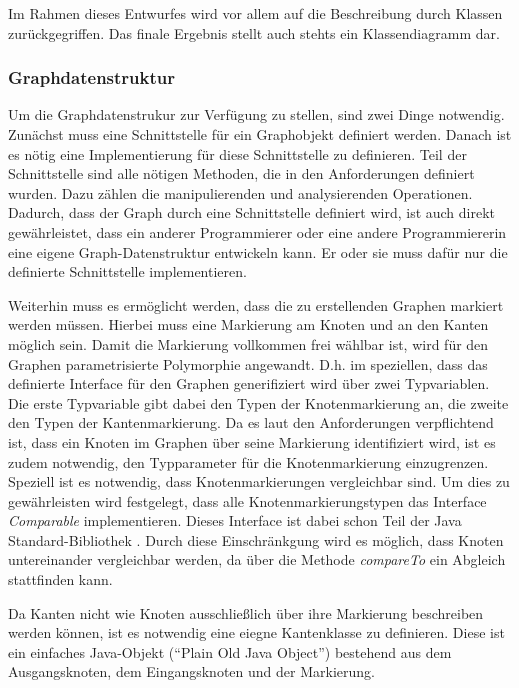 \documentclass[a4paper,12pt,ngerman,chapterprefix=false,listof=totoc,bibliography=totoc]{scrreprt}
\begin{document}
{{{Im Rahmen dieses Entwurfes wird vor allem auf die Beschreibung durch Klassen zurückgegriffen. Das finale Ergebnis stellt auch stehts ein Klassendiagramm dar.
}
\subsubsection*{Graphdatenstruktur}
{
Um die Graphdatenstrukur zur Verfügung zu stellen, sind zwei Dinge notwendig. Zunächst muss eine Schnittstelle für ein Graphobjekt definiert werden. Danach ist es nötig eine Implementierung für diese Schnittstelle zu definieren. Teil der Schnittstelle sind alle nötigen Methoden, die in den Anforderungen definiert wurden. Dazu zählen die manipulierenden und analysierenden Operationen. Dadurch, dass der Graph durch eine Schnittstelle definiert wird, ist auch direkt gewährleistet, dass ein anderer Programmierer oder eine andere Programmiererin eine eigene Graph-Datenstruktur entwickeln kann. Er oder sie muss dafür nur die definierte Schnittstelle implementieren.

Weiterhin muss es ermöglicht werden, dass die zu erstellenden Graphen markiert werden müssen. Hierbei muss eine Markierung am Knoten und an den Kanten möglich sein. Damit die Markierung vollkommen frei wählbar ist, wird für den Graphen parametrisierte Polymorphie angewandt. D.h. im speziellen, dass das definierte Interface für den Graphen generifiziert wird über zwei Typvariablen. Die erste Typvariable gibt dabei den Typen der Knotenmarkierung an, die zweite den Typen der Kantenmarkierung. Da es laut den Anforderungen verpflichtend ist, dass ein Knoten im Graphen über seine Markierung identifiziert wird, ist es zudem notwendig, den Typparameter für die Knotenmarkierung einzugrenzen. Speziell ist es notwendig, dass Knotenmarkierungen vergleichbar sind. Um dies zu gewährleisten wird festgelegt, dass alle Knotenmarkierungstypen das Interface \textit{Comparable} implementieren. Dieses Interface ist dabei schon Teil der Java Standard-Bibliothek \cite{oracle_java_2021}. Durch diese Einschränkgung wird es möglich, dass Knoten untereinander vergleichbar werden, da über die Methode \textit{compareTo} ein Abgleich stattfinden kann.

Da Kanten nicht wie Knoten ausschließlich über ihre Markierung beschreiben werden können, ist es notwendig eine eiegne Kantenklasse zu definieren. Diese ist ein einfaches Java-Objekt ("`Plain Old Java Object"') bestehend aus dem Ausgangsknoten, dem Eingangsknoten und der Markierung.

}}}
\end{document}

